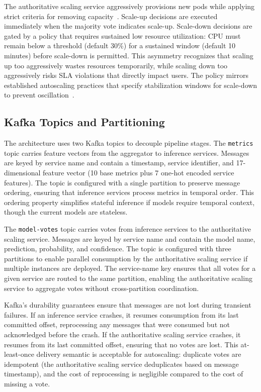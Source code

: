 \documentclass[conference]{IEEEtran}
\begin{document}
The authoritative scaling service aggressively provisions new pods while applying strict criteria for removing capacity~\cite{lorido2014autoscaling}. Scale-up decisions are executed immediately when the majority vote indicates scale-up. Scale-down decisions are gated by a policy that requires sustained low resource utilization: CPU must remain below a threshold (default 30\%) for a sustained window (default 10 minutes) before scale-down is permitted. This asymmetry recognizes that scaling up too aggressively wastes resources temporarily, while scaling down too aggressively risks SLA violations that directly impact users. The policy mirrors established autoscaling practices that specify stabilization windows for scale-down to prevent oscillation~\cite{hasan2020horizontal}.


\subsection{Kafka Topics and Partitioning}

The architecture uses two Kafka topics to decouple pipeline stages. The \texttt{metrics} topic carries feature vectors from the aggregator to inference services. Messages are keyed by service name and contain a timestamp, service identifier, and 17-dimensional feature vector (10 base metrics plus 7 one-hot encoded service features). The topic is configured with a single partition to preserve message ordering, ensuring that inference services process metrics in temporal order. This ordering property simplifies stateful inference if models require temporal context, though the current models are stateless.

The \texttt{model-votes} topic carries votes from inference services to the authoritative scaling service. Messages are keyed by service name and contain the model name, prediction, probability, and confidence. The topic is configured with three partitions to enable parallel consumption by the authoritative scaling service if multiple instances are deployed. The service-name key ensures that all votes for a given service are routed to the same partition, enabling the authoritative scaling service to aggregate votes without cross-partition coordination.

Kafka's durability guarantees ensure that messages are not lost during transient failures. If an inference service crashes, it resumes consumption from its last committed offset, reprocessing any messages that were consumed but not acknowledged before the crash. If the authoritative scaling service crashes, it resumes from its last committed offset, ensuring that no votes are lost. This at-least-once delivery semantic is acceptable for autoscaling: duplicate votes are idempotent (the authoritative scaling service deduplicates based on message timestamp), and the cost of reprocessing is negligible compared to the cost of missing a vote.
\end{document}
